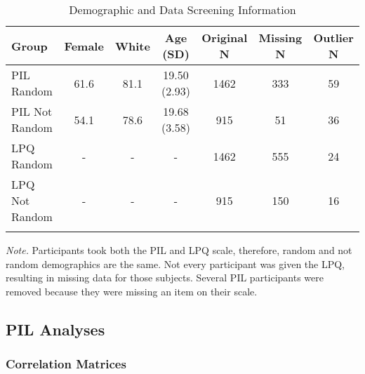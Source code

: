 \documentclass[english,man, mask]{apa6}
\theoremstyle{definition}
\theoremstyle{definition}
\theoremstyle{definition}
\theoremstyle{remark}
\begin{document}
\begin{table}[tbp]
\begin{center}
\begin{threeparttable}
\caption{\label{tab:demo-table}Demographic and Data Screening Information}
\begin{tabular}{lcccccc}
\toprule
Group & \multicolumn{1}{c}{Female} & \multicolumn{1}{c}{White} & \multicolumn{1}{c}{Age (SD)} & \multicolumn{1}{c}{Original N} & \multicolumn{1}{c}{Missing N} & \multicolumn{1}{c}{Outlier N}\\
\midrule
PIL Random & 61.6 & 81.1 & 19.50 (2.93) & 1462 & 333 & 59\\
PIL Not Random & 54.1 & 78.6 & 19.68 (3.58) & 915 & 51 & 36\\
LPQ Random & - & - & - & 1462 & 555 & 24\\
LPQ Not Random & - & - & - & 915 & 150 & 16\\
\bottomrule
\addlinespace
\end{tabular}
\begin{tablenotes}[para]
\textit{Note.} Participants took both the PIL and LPQ scale, therefore, random and not random demographics are the same. Not every participant was given the LPQ, resulting in missing data for those subjects. Several PIL participants were removed because they were missing an item on their scale.
\end{tablenotes}
\end{threeparttable}
\end{center}
\end{table}

\subsection{PIL Analyses}\label{pil-analyses}

\subsubsection{Correlation Matrices}\label{correlation-matrices}
\end{document}
